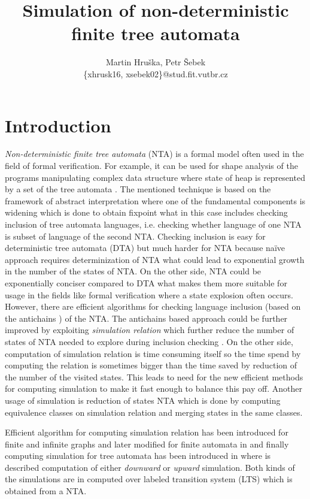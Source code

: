 \documentclass[a4paper, 12pt]{article}
\title{Simulation of non-deterministic finite tree automata}
\author{Martin Hruška, Petr Šebek\\\{xhrusk16, xsebek02\}@stud.fit.vutbr.cz}
\date{}
\begin{document}
\maketitle

\section{Introduction}
\label{sec:intro}

\textit{Non-deterministic finite tree automata} (NTA) is a formal model often used in the field of formal verification.
For example, it can be used for shape analysis of the programs manipulating complex data structure where
state of heap is represented by a set of the tree automata \cite{methods12}.
The mentioned technique is based on the framework of abstract interpretation where one of the fundamental components
is widening which is done to obtain fixpoint what in this case includes checking inclusion of tree automata languages, i.e.
checking whether language of one NTA is subset of language of the second NTA.
Checking inclusion is easy for deterministic tree automata (DTA) but much harder for NTA because
na{\"i}ve approach requires determinization of NTA what could lead to exponential growth in the number of the states of NTA.
On the other side, NTA could be exponentially conciser compared to DTA what makes them more suitable for usage in the fields
like formal verification where a state explosion often occurs.
However, there are efficient algorithms for checking language inclusion (based on the antichains \cite{tacas10}) of the NTA.
The antichains based approach could be further improved by exploiting \emph{simulation relation} which further reduce
the number of states of NTA needed to explore during inclusion checking \cite{tacas10}.
On the other side, computation of simulation relation is time consuming itself so the time spend by computing the relation
is sometimes bigger than the time saved by reduction of the number of the visited states.
This leads to need for the new efficient methods for computing simulation to make it fast enough to balance this pay off.
Another usage of simulation is reduction of states NTA which is done by computing equivalence classes on simulation relation and merging states in the same classes.

Efficient algorithm for computing simulation relation has been introduced for finite and infinite graphs \cite{focs95} and
later modified for finite automata in \cite{ilie:nfa} and finally computing simulation for tree automata has been introduced in \cite{tacas08}
where is described computation of either \emph{downward} or \emph{upward} simulation.
Both kinds of the simulations are in \cite{tacas08} computed over labeled transition system (LTS) which is obtained from a NTA.
\end{document}
